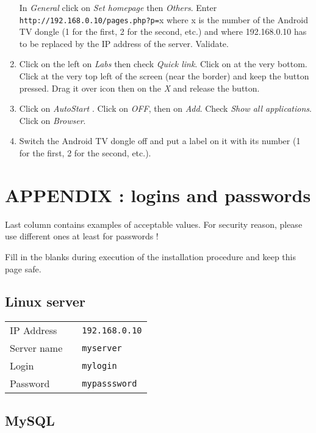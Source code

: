 \documentclass[a4paper]{ffco-rapport}
\begin{document}
\begin{enumerate}
					In \emph{General} click on \emph{Set homepage} then \emph{Others}. Enter \texttt{http://192.168.0.10/pages.php?p=}x where x is the number of the Android TV dongle (1 for the first, 2 for the second, etc.) and where 192.168.0.10 has to be replaced by the IP address of the server. Validate.
		\item Click on the left on \emph{Labs} then check \emph{Quick link}.
					Click on  at the very bottom.
					Click at the very top left of the screen (near the border) and keep the button pressed. Drag it over icon  then on the \emph{X} and release the button.
		\item Click on \emph{AutoStart} . Click on \emph{OFF}, then on \emph{Add}.
					Check \emph{Show all applications}. Click on \emph{Browser}.
		\item Switch the Android TV dongle off and put a label on it with its number (1 for the first, 2 for the second, etc.).
		
	\end{enumerate}

\chapter*{APPENDIX : logins and passwords}

Last column contains examples of acceptable values. For security reason, please use different ones at least for passwords !

Fill in the blanks during execution of the installation procedure and keep this page safe.

\section*{Linux server}

\begin{tabular}{lp{6cm}l}
	IP Address  & \hrulefill &\color{gray}\footnotesize\texttt{192.168.0.10}\\
	Server name & \hrulefill &\color{gray}\footnotesize\texttt{myserver}\\
	Login & \hrulefill &\color{gray}\footnotesize\texttt{mylogin}\\
	Password & \hrulefill &\color{gray}\footnotesize\texttt{mypasssword}\\
\end{tabular}


\section*{MySQL}
\end{document}
